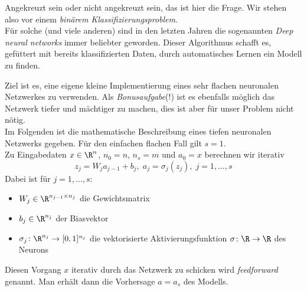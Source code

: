 \vspace{-1.5em}

Angekreuzt sein oder nicht angekreuzt sein, das ist hier die Frage. 
Wir stehen also vor einem \emph{binärem Klassifizierungsproblem}.\\
Für solche (und viele anderen) sind in den letzten Jahren die sogenannten \emph{Deep neural networks} immer beliebter geworden. Dieser Algorithmus schafft es, gefüttert mit bereits klassifizierten Daten, durch automatisches Lernen ein Modell zu finden.


Ziel ist es, eine eigene kleine Implementierung eines sehr flachen neuronalen Netzwerkes zu verwenden. 
Als \emph{Bonusaufgabe}(!) ist es ebenfalls möglich das Netzwerk tiefer und mächtiger zu machen, dies ist aber für unser Problem nicht nötig.\\

Im Folgenden ist die mathematische Beschreibung eines tiefen neuronalen Netzwerks gegeben. Für den einfachen flachen Fall gilt $s=1$.\\
Zu Eingabedaten $x\in \R^n$, $n_0=n$, $n_s=m$ und $a_0=x$ berechnen wir iterativ 
$$z_j=W_ja_{j-1} + b_j,\;a_j=\sigma_j(z_j),\;j=1,\dots,s$$
Dabei ist für $j=1,\dots,s$:
\begin{itemize}
 \item $W_j \in \R^{n_{j-1}\times n_j}$ die Gewichtsmatrix
 \item $b_j \in \R^{n_j}$ der Biasvektor
 \item $\sigma_j \colon \R^{n_j} \to [0,1]^{n_j}$ die vektorisierte Aktivierungsfunktion $\sigma \colon \R \to \R$ des Neurons
\end{itemize}
Diesen Vorgang $x$ iterativ durch das Netzwerk zu schicken wird \emph{feedforward} genannt. Man erhält dann die Vorhersage $a=a_s$ des Modells.\\

